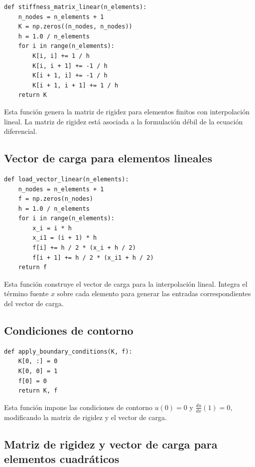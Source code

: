 \begin{verbatim}
def stiffness_matrix_linear(n_elements):
    n_nodes = n_elements + 1
    K = np.zeros((n_nodes, n_nodes))
    h = 1.0 / n_elements
    for i in range(n_elements):
        K[i, i] += 1 / h
        K[i, i + 1] += -1 / h
        K[i + 1, i] += -1 / h
        K[i + 1, i + 1] += 1 / h
    return K
\end{verbatim}

Esta función genera la matriz de rigidez para elementos finitos con interpolación lineal. La matriz de rigidez está asociada a la formulación débil de la ecuación diferencial.

\subsection{Vector de carga para elementos lineales}

\begin{verbatim}
def load_vector_linear(n_elements):
    n_nodes = n_elements + 1
    f = np.zeros(n_nodes)
    h = 1.0 / n_elements
    for i in range(n_elements):
        x_i = i * h
        x_i1 = (i + 1) * h
        f[i] += h / 2 * (x_i + h / 2)
        f[i + 1] += h / 2 * (x_i1 + h / 2)
    return f
\end{verbatim}

Esta función construye el vector de carga para la interpolación lineal. Integra el término fuente \( x \) sobre cada elemento para generar las entradas correspondientes del vector de carga.

\subsection{Condiciones de contorno}

\begin{verbatim}
def apply_boundary_conditions(K, f):
    K[0, :] = 0
    K[0, 0] = 1
    f[0] = 0
    return K, f
\end{verbatim}

Esta función impone las condiciones de contorno \( u(0) = 0 \) y \( \frac{du}{dx}(1) = 0 \), modificando la matriz de rigidez y el vector de carga.

\subsection{Matriz de rigidez y vector de carga para elementos cuadráticos}

